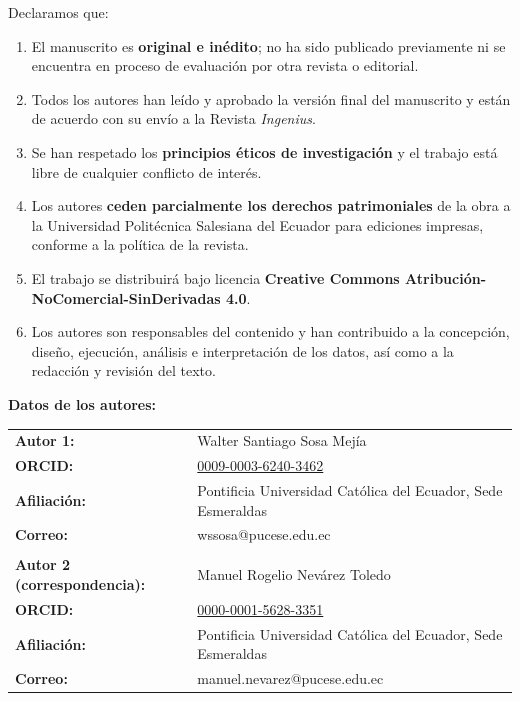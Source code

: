 \documentclass[12pt]{article}
\begin{document}
\vspace{0.3cm}

\noindent Declaramos que:

\begin{enumerate}
\item El manuscrito es \textbf{original e in\'edito}; no ha sido publicado previamente ni se encuentra en proceso de evaluaci\'on por otra revista o editorial.
\item Todos los autores han le\'ido y aprobado la versi\'on final del manuscrito y est\'an de acuerdo con su env\'io a la Revista \textit{Ingenius}.
\item Se han respetado los \textbf{principios \'eticos de investigaci\'on} y el trabajo est\'a libre de cualquier conflicto de inter\'es.
\item Los autores \textbf{ceden parcialmente los derechos patrimoniales} de la obra a la Universidad Polit\'ecnica Salesiana del Ecuador para ediciones impresas, conforme a la pol\'itica de la revista.
\item El trabajo se distribuir\'a bajo licencia \textbf{Creative Commons Atribuci\'on-NoComercial-SinDerivadas 4.0}.
\item Los autores son responsables del contenido y han contribuido a la concepci\'on, dise\~no, ejecuci\'on, an\'alisis e interpretaci\'on de los datos, as\'i como a la redacci\'on y revisi\'on del texto.
\end{enumerate}

\vspace{0.3cm}

\noindent \textbf{Datos de los autores:}

\vspace{0.2cm}

\noindent
\begin{tabular}{ll}
\textbf{Autor 1:} & Walter Santiago Sosa Mej\'ia \\
\textbf{ORCID:} & \href{https://orcid.org/0009-0003-6240-3462}{0009-0003-6240-3462} \\
\textbf{Afiliaci\'on:} & Pontificia Universidad Cat\'olica del Ecuador, Sede Esmeraldas \\
\textbf{Correo:} & wssosa@pucese.edu.ec \\
\\
\textbf{Autor 2 (correspondencia):} & Manuel Rogelio Nev\'arez Toledo \\
\textbf{ORCID:} & \href{https://orcid.org/0000-0001-5628-3351}{0000-0001-5628-3351} \\
\textbf{Afiliaci\'on:} & Pontificia Universidad Cat\'olica del Ecuador, Sede Esmeraldas \\
\textbf{Correo:} & manuel.nevarez@pucese.edu.ec \\
\end{tabular}
\end{document}
